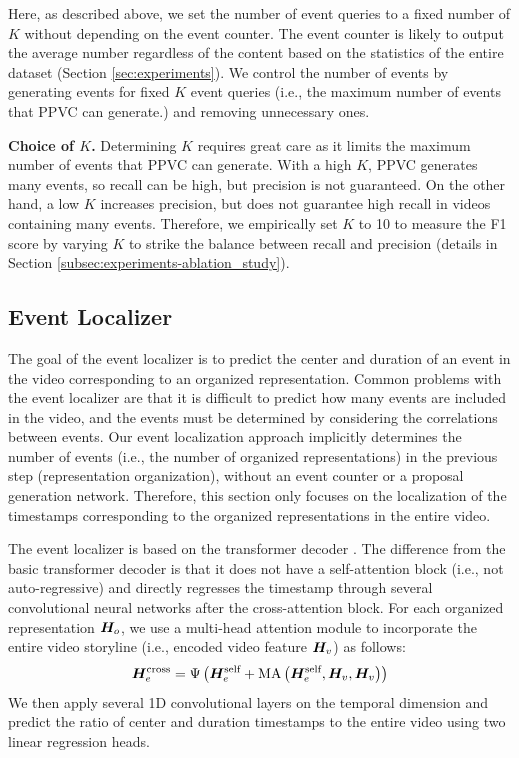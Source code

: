 Here, as described above, we set the number of event queries to a fixed number of $K$ without depending on the event counter.
The event counter is likely to output the average number regardless of the content based on the statistics of the entire dataset (Section \ref{sec:experiments}).
We control the number of events by generating events for fixed $K$ event queries (i.e., the maximum number of events that PPVC can generate.) and removing unnecessary ones.

\textbf{Choice of $K$.}
Determining $K$ requires great care as it limits the maximum number of events that PPVC can generate.
With a high $K$, PPVC generates many events, so recall can be high, but precision is not guaranteed. 
On the other hand, a low $K$ increases precision, but does not guarantee high recall in videos containing many events.
Therefore, we empirically set $K$ to 10 to measure the F1 score by varying $K$ to strike the balance between recall and precision (details in Section \ref{subsec:experiments-ablation_study}).

\subsection{Event Localizer}
\label{subsec:method_event_localizer}
The goal of the event localizer is to predict the center and duration of an event in the video corresponding to an organized representation.
Common problems with the event localizer are that it is difficult to predict how many events are included in the video, and the events must be determined by considering the correlations between events.
Our event localization approach implicitly determines the number of events (i.e., the number of organized representations) in the previous step (representation organization), without an event counter or a proposal generation network.
Therefore, this section only focuses on the localization of the timestamps corresponding to the organized representations in the entire video.

The event localizer is based on the transformer decoder \cite{vaswani2017attention}.
The difference from the basic transformer decoder is that it does not have a self-attention block (i.e., not auto-regressive) and directly regresses the timestamp through several convolutional neural networks after the cross-attention block.
For each organized representation $\bm{H}_o$, we use a multi-head attention module to incorporate the entire video storyline (i.e., encoded video feature $\bm{H}_v$) as follows:
\begin{equation}
  \bm{H}_e^{\text{cross}} = \Psi \left( \bm{H}_e^{\text{self}} + \text{MA} \left( \bm{H}_e^{\text{self}}, \bm{H}_{v}, \bm{H}_{v} \right) \right)
  \label{eq:event_localizer_cross_attention}
\end{equation}
We then apply several 1D convolutional layers on the temporal dimension and predict the ratio of center and duration timestamps to the entire video using two linear regression heads.

